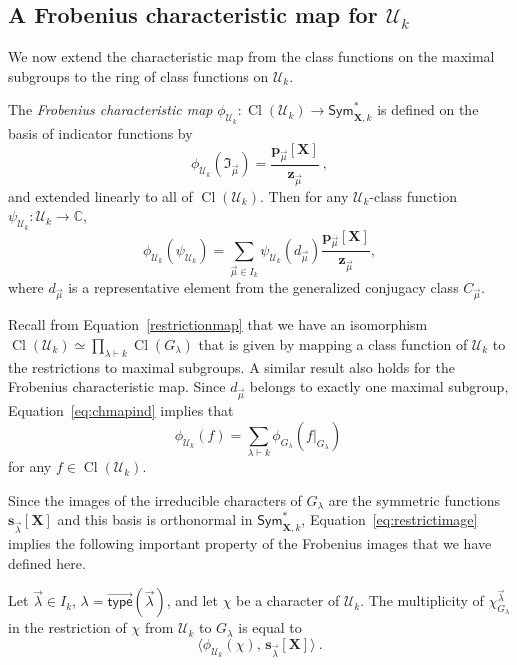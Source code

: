\documentclass[ALCO,Unicode]{cedram}
\newcommand{\defncolor}{\color{darkred}}
\newcommand{\defn}[1]{{\defncolor\emph{#1}}} %
\newcommand{\CC}{\mathbb C}
\newcommand{\ind}{\mathfrak{I}}
\newcommand{\vtype}{\overrightarrow{\mathsf{type}}}
\newcommand{\XXX}{\mathbf{X}}
\newcommand{\class}{\operatorname{Cl}}
\begin{document}
\subsection{A Frobenius characteristic map for $\mathcal{U}_k$}
\label{subsec:UkFrob}
We now extend the characteristic map from the class functions
on the maximal subgroups to the ring of class functions
on $\mathcal{U}_k$.

The \defn{Frobenius characteristic map}
$\phi_{\mathcal{U}_k}: \class(\mathcal{U}_k) \to \mathsf{Sym}^{\ast}_{\XXX,k}$
is defined on the basis of indicator functions by
\begin{equation}\label{eq:chmapind}
\phi_{\mathcal{U}_k}( \ind_{\vec{\mu}} ) = \frac{\mathbf{p}_{\vec{\mu}}[\XXX]}{\mathbf{z}_{\vec{\mu}}}~,
\end{equation}
and extended linearly to all of $\class(\mathcal{U}_k)$.
Then for any $\mathcal{U}_k$-class function
$\psi_{\mathcal{U}_k} \colon \mathcal{U}_k \rightarrow \CC$,
\begin{equation}
\label{equation.phi Uk}
    \phi_{\mathcal{U}_k}( \psi_{\mathcal{U}_k} ) = \sum_{\vec{\mu}\in I_k}
    \psi_{\mathcal{U}_k}(d_{\vec{\mu}}) \frac{\mathbf{p}_{\vec{\mu}}[\XXX]}{\mathbf{z}_{\vec{\mu}}},
\end{equation}
where $d_{\vec{\mu}}$ is a representative element from the
generalized conjugacy class $C_{\vec{\mu}}$.

Recall from Equation~\eqref{restrictionmap} that we have an isomorphism
$\class(\mathcal{U}_k) \simeq \prod_{\lambda \vdash k} \class(G_\lambda)$
that is given by mapping a class function of $\mathcal{U}_k$ to the
restrictions to maximal subgroups.
A similar result also holds for the Frobenius characteristic map.
Since $d_{\vec{\mu}}$ belongs to exactly one maximal subgroup,
Equation~\eqref{eq:chmapind} implies that
\begin{equation}\label{eq:restrictimage}
\phi_{\mathcal{U}_k}( f ) = \sum_{\lambda \vdash k}
\phi_{G_\lambda}( f |_{G_\lambda})~
\end{equation}
for any $f \in \class({\mathcal{U}_k})$.

Since the images of the irreducible characters of $G_\lambda$ are the symmetric
functions $\mathbf{s}_{\vec{\lambda}}[\XXX]$
and this basis is orthonormal in $\mathsf{Sym}^{\ast}_{\XXX,k}$,
Equation~\eqref{eq:restrictimage} implies the following important property
of the Frobenius images that we have defined here.

\begin{prop}\label{prop:multiplicity}
Let $\vec{\lambda} \in I_k$, $\lambda = \vtype(\vec{\lambda})$,
and let $\chi$ be a character of $\mathcal{U}_k$.
The multiplicity of $\chi_{G_\lambda}^{\vec{\lambda}}$
in the restriction of $\chi$ from $\mathcal{U}_k$ to $G_\lambda$
is equal to
\[
    \big\langle \phi_{\mathcal{U}_k}( \chi ), \, \mathbf{s}_{\vec{\lambda}}[\XXX] \big\rangle~.
\]
\end{prop}
\end{document}
